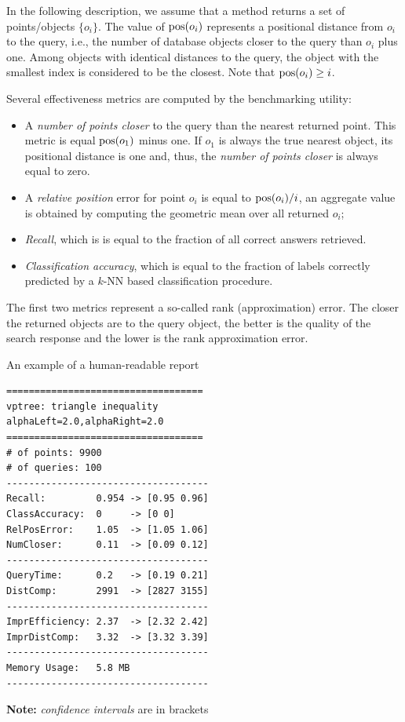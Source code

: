 \documentclass[runningheads,a4paper]{llncs}
\newcommand{\knn}{$k$-NN }
\newcommand{\pos}{\mbox{\rm pos}}
\begin{document}
{In the following description, we assume that a method returns 
a set of points/objects $\{o_i\}$.
The value of $\pos(o_i)$ represents a positional distance from $o_i$ to the query, 
i.e., the number of database objects closer to the query than $o_i$ plus one.
Among objects with identical distances to the query, 
the object with the smallest index is considered to be the closest.
Note that $\pos(o_i) \ge i$.

Several effectiveness metrics are computed by the benchmarking utility:
\begin{itemize}
\item  A \emph{number of points closer} to the query than the nearest returned point.
This metric is equal $\pos(o_1)$ minus one. If $o_1$ is always the true nearest object,
its positional distance is one and, thus, the \emph{number of points closer} is always equal to zero.
\item A \emph{relative position} error for point $o_i$ is equal to $\pos(o_i)/i$,
an aggregate value is obtained by computing the geometric mean over all returned $o_i$;
\item \emph{Recall},  which is is equal to the fraction of all correct answers retrieved.
\item \emph{Classification accuracy}, which is equal to the fraction of labels correctly
predicted by a \knn based classification procedure.
\end{itemize}

The first two metrics represent a so-called rank (approximation) error.
The closer the returned objects are to the query object, 
the better is the quality of the search response and the lower is the rank 
approximation error.

\begin{table}
\caption{An example of a human-readable report 
\label{TableHRep}}
\begin{verbatim}
===================================
vptree: triangle inequality
alphaLeft=2.0,alphaRight=2.0
===================================
# of points: 9900
# of queries: 100
------------------------------------
Recall:         0.954 -> [0.95 0.96]
ClassAccuracy:  0     -> [0 0]
RelPosError:    1.05  -> [1.05 1.06]
NumCloser:      0.11  -> [0.09 0.12]
------------------------------------
QueryTime:      0.2   -> [0.19 0.21]
DistComp:       2991  -> [2827 3155]
------------------------------------
ImprEfficiency: 2.37  -> [2.32 2.42]
ImprDistComp:   3.32  -> [3.32 3.39]
------------------------------------
Memory Usage:   5.8 MB
------------------------------------
\end{verbatim}
\textbf{Note:} \emph{confidence intervals} are in brackets
\end{table}


}
\end{document}
